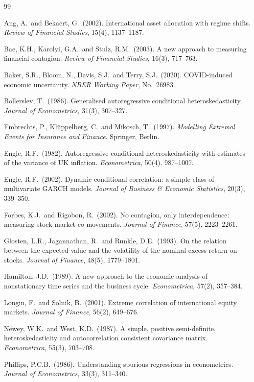 \documentclass[11pt,a4paper]{article}
\begin{document}
% 
\newpage

\begin{thebibliography}{99}

Ang, A.\ and Bekaert, G.\ (2002).
International asset allocation with regime shifts.
\textit{Review of Financial Studies}, 15(4), 1137--1187.

Bae, K.H., Karolyi, G.A.\ and Stulz, R.M.\ (2003).
A new approach to measuring financial contagion.
\textit{Review of Financial Studies}, 16(3), 717--763.

Baker, S.R., Bloom, N., Davis, S.J.\ and Terry, S.J.\ (2020).
COVID-induced economic uncertainty.
\textit{NBER Working Paper}, No.~26983.

Bollerslev, T.\ (1986).
Generalised autoregressive conditional heteroskedasticity.
\textit{Journal of Econometrics}, 31(3), 307--327.

Embrechts, P., Kl\"{u}ppelberg, C.\ and Mikosch, T.\ (1997).
\textit{Modelling Extremal Events for Insurance and Finance}.
Springer, Berlin.

Engle, R.F.\ (1982).
Autoregressive conditional heteroskedasticity with estimates of the variance of UK inflation.
\textit{Econometrica}, 50(4), 987--1007.

Engle, R.F.\ (2002).
Dynamic conditional correlation: a simple class of multivariate GARCH models.
\textit{Journal of Business \& Economic Statistics}, 20(3), 339--350.

Forbes, K.J.\ and Rigobon, R.\ (2002).
No contagion, only interdependence: measuring stock market co-movements.
\textit{Journal of Finance}, 57(5), 2223--2261.

Glosten, L.R., Jagannathan, R.\ and Runkle, D.E.\ (1993).
On the relation between the expected value and the volatility of the nominal excess return on stocks.
\textit{Journal of Finance}, 48(5), 1779--1801.

Hamilton, J.D.\ (1989).
A new approach to the economic analysis of nonstationary time series and the business cycle.
\textit{Econometrica}, 57(2), 357--384.

Longin, F.\ and Solnik, B.\ (2001).
Extreme correlation of international equity markets.
\textit{Journal of Finance}, 56(2), 649--676.

Newey, W.K.\ and West, K.D.\ (1987).
A simple, positive semi-definite, heteroskedasticity and autocorrelation consistent covariance matrix.
\textit{Econometrica}, 55(3), 703--708.

Phillips, P.C.B.\ (1986).
Understanding spurious regressions in econometrics.
\textit{Journal of Econometrics}, 33(3), 311--340.

\end{thebibliography}
\end{document}
